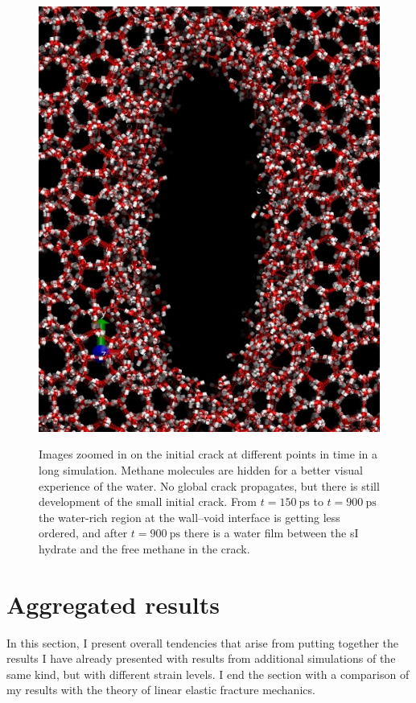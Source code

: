 \begin{figure}
\begin{minipage}[b]{0.24\linewidth}
{\includegraphics[width=\linewidth]{../pictures/snapshots_1045_280K/t_900000.pdf}}
\end{minipage}
\caption{Images zoomed in on the initial crack at different points in time in a long simulation. Methane molecules are hidden for a better visual experience of the water. No global crack propagates, but there is still development of the small initial crack. From $t= \SI{150}{\pico\second}$ to $t=\SI{900}{\pico\second}$ the water-rich region at the wall--void interface is getting less ordered, and after $t=\SI{900}{\pico\second}$ there is a water film between the sI hydrate and the free methane in the crack.}
\label{fig:crack_no_propagate_long_time_snapshots}
\end{figure}

\section{Aggregated results}
In this section, I present overall tendencies that arise from putting together the results I have already presented with results from additional simulations of the same kind, but with different strain levels. I end the section with a comparison of my results with the theory of linear elastic fracture mechanics.

